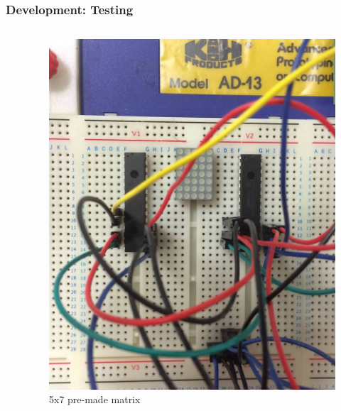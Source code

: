 \documentclass{beamer}
\begin{document}
\begin{frame}
\frametitle{Development: Testing}

\begin{columns}

\begin{column}{0.05\textwidth}
\end{column}

\begin{column}{0.4\textwidth}
\begin{figure}
	\includegraphics[scale=0.1]{images/led_matrix.jpg}
	\caption{5x7 pre-made matrix}
\end{figure}
\end{column}



\end{columns}
\end{frame}
\end{document}

